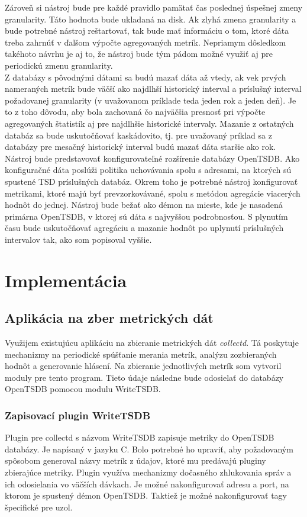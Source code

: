 \documentclass[printed,11pt,twoside,color,cover,table]{fithesis3}
\begin{document}
Zároveň si nástroj bude pre každé pravidlo pamätať čas poslednej úspešnej zmeny granularity. Táto hodnota bude ukladaná na disk. Ak zlyhá zmena granularity a bude potrebné nástroj reštartovať, 
tak bude mať informáciu o tom, ktoré dáta treba zahrnúť v ďalšom výpočte agregovaných metrík. Nepriamym dôsledkom takéhoto návrhu je aj to, že nástroj bude tým pádom možné využiť aj pre periodickú
zmenu granularity.
\\Z databázy s pôvodnými dátami sa budú mazať dáta až vtedy, ak vek prvých nameraných metrík bude väčší ako najdlhší historický interval a príslušný interval požadovanej granularity (v uvažovanom príklade 
teda jeden rok a jeden deň). Je to z toho dôvodu, aby bola zachovaná čo najväčšia presnosť pri výpočte agregovaných štatistík aj pre najdlhšie historické intervaly. Mazanie z ostatných databáz sa bude 
uskutočňovať kaskádovito, tj. pre uvažovaný príklad sa z databázy pre mesačný historický interval budú mazať dáta staršie ako rok.
\\Nástroj bude predstavovať konfigurovateľné rozšírenie databázy OpenTSDB. Ako konfiguračné dáta poslúži politika uchovávania spolu s adresami, na ktorých sú spustené TSD príslušných databáz. Okrem toho je potrebné nástroj konfigurovať
metrikami, ktoré majú byť prevzorkovávané, spolu s metódou agregácie viacerých hodnôt do jednej. Nástroj bude bežať ako démon na mieste,
kde je nasadená primárna OpenTSDB, v ktorej sú dáta s najvyššou podrobnosťou. S plynutím času bude uskutočňovať agregáciu a mazanie hodnôt
po uplynutí príslušných intervalov tak, ako som popisoval vyššie.

\chapter{Implementácia}
\section{Aplikácia na zber metrických dát}
Využijem existujúcu aplikáciu na zbieranie metrických dát \emph{collectd}. Tá poskytuje mechanizmy na periodické spúšťanie merania metrík,
analýzu zozbieraných hodnôt a generovanie hlásení. Na zbieranie jednotlivých metrík som vytvoril moduly pre tento program. Tieto údaje následne bude odosielať do databázy OpenTSDB
pomocou modulu WriteTSDB.

\subsection{Zapisovací plugin WriteTSDB}
Plugin pre collectd s názvom WriteTSDB zapisuje metriky do OpenTSDB databázy.\cite{writetsdb} 
Je napísaný v jazyku C. Bolo potrebné ho upraviť, aby požadovaným spôsobom generoval názvy metrík z údajov, ktoré mu predávajú pluginy zbierajúce metriky. Plugin využíva mechanizmy
dočasného zhlukovania správ a ich odosielania vo väčších dávkach. Je možné nakonfigurovať adresu a port, na ktorom je spustený
démon OpenTSDB. Taktiež je možné nakonfigurovať tagy špecifické pre uzol.
\end{document}
